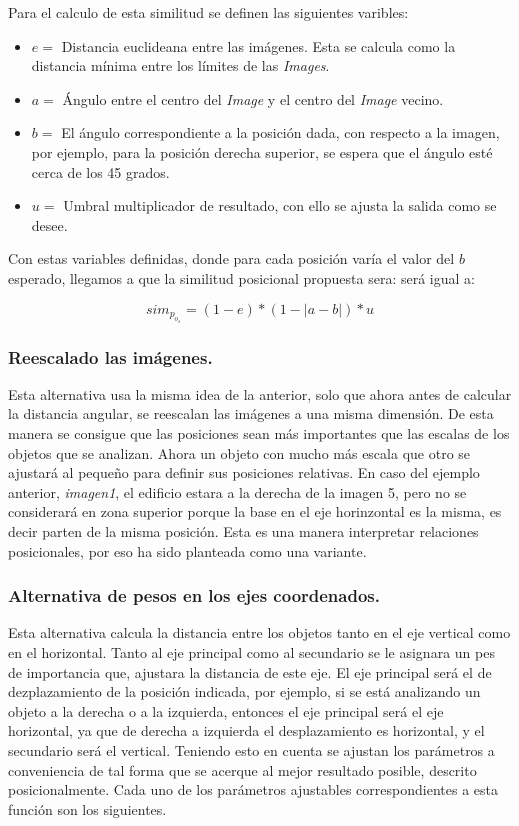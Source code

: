 Para el calculo de esta similitud se definen las siguientes varibles:
\begin{itemize}
    \item $e =$ Distancia euclideana entre las im\'agenes. Esta se calcula como la distancia m\'inima entre los l\'imites de las \textit{Images}.

    \item $a =$ \'Angulo entre el centro del \textit{Image} y  el centro del \textit{Image} vecino.

    \item $b =$  El ángulo correspondiente a la posición dada, con respecto a la imagen, por ejemplo, para la posición derecha superior, se espera que el ángulo esté cerca de los 45 grados.

    \item $u =$  Umbral multiplicador de resultado, con ello se ajusta la salida como se desee.
\end{itemize}
Con estas variables definidas, donde para cada posici\'on var\'ia el valor del $b$ esperado, llegamos a que la similitud posicional propuesta sera: ser\'a igual a:

\[sim_p_o_s = (1-e)*(1- |a-b|) * u \]

\subsubsection{Reescalado las imágenes.}

Esta alternativa usa la misma idea de la anterior, solo que ahora antes de calcular la distancia angular, se reescalan las imágenes a una misma dimensión. De esta manera se consigue que las posiciones sean más importantes que las escalas de los objetos que se analizan. Ahora un objeto con mucho más escala que otro se ajustará al pequeño para definir sus posiciones relativas. En caso del ejemplo anterior, \textit{imagen1}, el edificio estara a la derecha de la imagen 5, pero no se considerar\'a en zona superior porque la base en el eje horinzontal es la misma, es decir parten de la misma posici\'on. Esta es una manera interpretar relaciones posicionales, por eso ha sido planteada como una variante.

\subsubsection{Alternativa de pesos en los ejes coordenados.}

Esta alternativa calcula la distancia entre los objetos tanto en el eje vertical como en el horizontal. Tanto al eje principal como al secundario se le asignara un pes de importancia que, ajustara la distancia de este eje. El eje principal ser\'a el de dezplazamiento de la posici\'on indicada, por ejemplo, si se está analizando un objeto a la derecha o a la izquierda, entonces el eje principal será el eje horizontal, ya que de derecha a izquierda el desplazamiento es horizontal, y el secundario será el vertical. Teniendo esto en cuenta se ajustan los parámetros a conveniencia de tal forma que se acerque al mejor resultado posible, descrito posicionalmente. Cada uno de los parámetros ajustables correspondientes a esta función son los siguientes.

